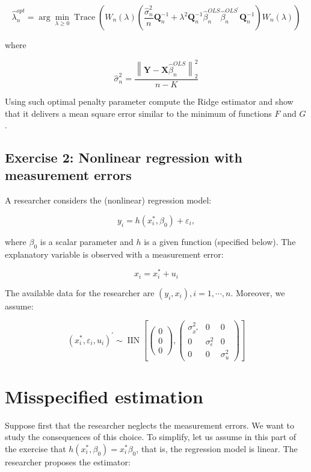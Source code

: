 $$
\hat{\lambda}_{n}^{o p t}=\arg \min _{\lambda \geq 0} \operatorname{Trace}\left(W_{n}(\lambda)\left(\frac{\hat{\sigma}_{n}^{2}}{n} \boldsymbol{Q}_{n}^{-1}+\lambda^{2} \boldsymbol{Q}_{n}^{-1} \hat{\beta}_{n}^{O L S} \hat{\beta}_{n}^{O L S^{\prime}} \boldsymbol{Q}_{n}^{-1}\right) W_{n}(\lambda)\right)
$$

where

$$
\hat{\sigma}_{n}^{2}=\frac{\left\|\boldsymbol{Y}-\boldsymbol{X} \hat{\beta}_{n}^{O L S}\right\|_{2}^{2}}{n-K}
$$

Using such optimal penalty parameter compute the Ridge estimator and show that it delivers a mean square error similar to the minimum of functions $F$ and $G$.

\subsection{Exercise 2: Nonlinear regression with measurement errors}
A researcher considers the (nonlinear) regression model:

$$
y_{i}=h\left(x_{i}^{*}, \beta_{0}\right)+\varepsilon_{i},
$$

where $\beta_{0}$ is a scalar parameter and $h$ is a given function (specified below). The explanatory variable is observed with a measurement error:

$$
x_{i}=x_{i}^{*}+u_{i}
$$

The available data for the researcher are $\left(y_{i}, x_{i}\right), i=1, \cdots, n$. Moreover, we assume:

$$
\left(x_{i}^{*}, \varepsilon_{i}, u_{i}\right)^{\prime} \sim \operatorname{IIN}\left[\left(\begin{array}{l}
0 \\
0 \\
0
\end{array}\right),\left(\begin{array}{ccc}
\sigma_{x^{*}}^{2} & 0 & 0 \\
0 & \sigma_{\epsilon}^{2} & 0 \\
0 & 0 & \sigma_{u}^{2}
\end{array}\right)\right]
$$

\section{Misspecified estimation}
Suppose first that the researcher neglects the measurement errors. We want to study the consequences of this choice. To simplify, let us assume in this part of the exercise that $h\left(x_{i}^{*}, \beta_{0}\right)=x_{i}^{*} \beta_{0}$, that is, the regression model is linear. The researcher proposes the estimator:

